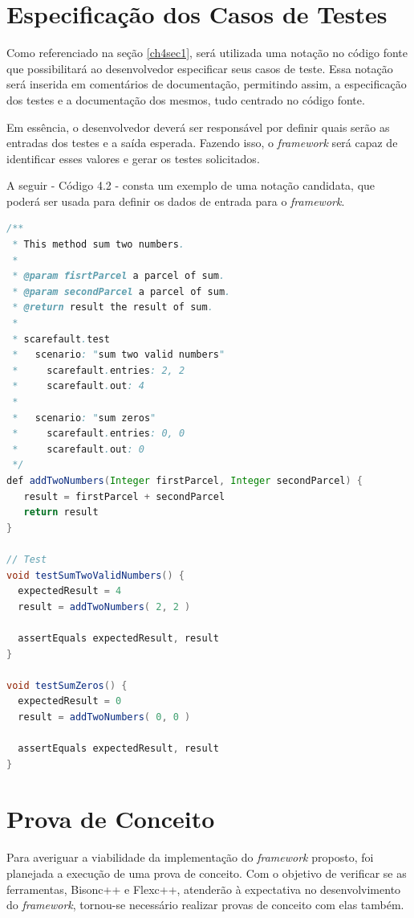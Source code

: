 \section{Especificação dos Casos de Testes}
Como referenciado na seção \ref{ch4sec1}, será utilizada uma notação no código fonte que possibilitará ao desenvolvedor especificar seus casos de teste. Essa notação será inserida em comentários de documentação, permitindo assim, a especificação dos testes e a documentação dos mesmos, tudo centrado no código fonte.
\par
\indent Em essência, o desenvolvedor deverá ser responsável por definir quais serão as entradas dos testes e a saída esperada. Fazendo isso, o \textit{framework} será capaz de identificar esses valores e gerar os testes solicitados.
\par
\indent A seguir - Código 4.2 - consta um exemplo de uma notação candidata, que poderá ser usada para definir os dados de entrada para o \textit{framework}.

\begin{lstlisting}[language=java, label=notacaoCandidata, caption={Notação Candidata}]
/**
 * This method sum two numbers.
 * 
 * @param fisrtParcel a parcel of sum.
 * @param secondParcel a parcel of sum.
 * @return result the result of sum.
 * 
 * scarefault.test
 *   scenario: "sum two valid numbers"
 *     scarefault.entries: 2, 2
 *     scarefault.out: 4
 *
 *   scenario: "sum zeros"
 *     scarefault.entries: 0, 0
 *     scarefault.out: 0
 */
def addTwoNumbers(Integer firstParcel, Integer secondParcel) {
   result = firstParcel + secondParcel
   return result
}

// Test
void testSumTwoValidNumbers() {
  expectedResult = 4
  result = addTwoNumbers( 2, 2 )
  
  assertEquals expectedResult, result
}

void testSumZeros() {
  expectedResult = 0
  result = addTwoNumbers( 0, 0 )
  
  assertEquals expectedResult, result
}
\end{lstlisting}

\section{Prova de Conceito}

Para averiguar a viabilidade da implementação do \textit{framework} proposto, foi planejada a execução de uma prova de conceito. Com o objetivo de verificar se as ferramentas, Bisonc++ e Flexc++, atenderão à expectativa no desenvolvimento do \textit{framework}, tornou-se necessário realizar provas de conceito com elas também. 

